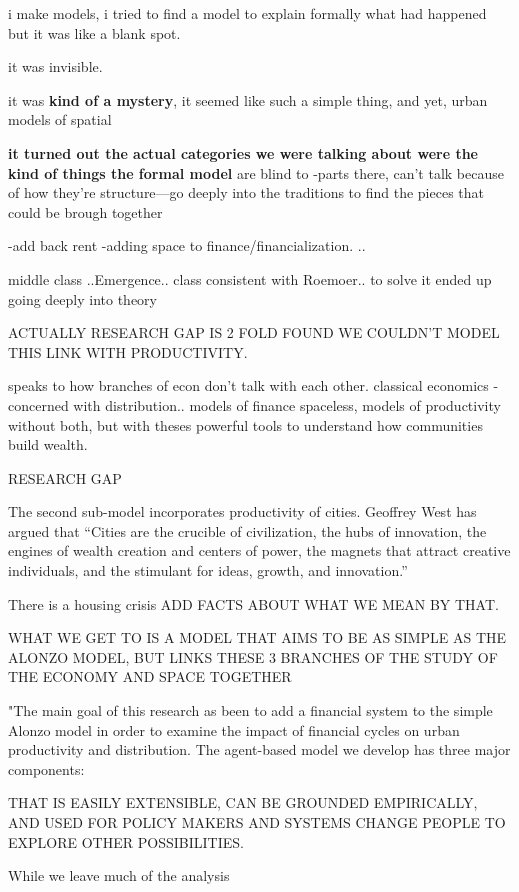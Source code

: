 i make models, i tried to find a model to explain formally what had happened
but it was like a blank spot. 

it was invisible. 

it was \textbf{kind of a mystery}, it seemed like such a simple thing, and yet, 
urban models of spatial 


\textbf{it turned out the actual categories we were talking about were the kind of things the formal model} are blind to
-parts there, can't talk because of how they're structure---go deeply into the traditions to find the pieces that could be brough together

-add back rent
-adding space to finance/financialization.
..


\gls{middle class}
..Emergence..
class consistent with Roemoer.. 
to solve it ended up going deeply into theory

ACTUALLY RESEARCH GAP IS 2 FOLD
FOUND WE COULDN'T MODEL THIS LINK WITH PRODUCTIVITY.


speaks to how branches of econ don't talk with each other. classical economics - concerned with distribution.. models of finance spaceless, models of productivity without both, but with theses powerful tools to understand how communities build wealth.


RESEARCH GAP

The second sub-model incorporates  productivity of cities. Geoffrey West has argued that ``Cities are the crucible of civilization, the hubs of innovation, the engines of wealth creation and centers of power, the magnets that attract creative individuals, and the stimulant for ideas, growth, and innovation.'' \cite{westScaleUniversalLaws2017} 


There is a housing crisis ADD FACTS ABOUT WHAT WE MEAN BY THAT.



WHAT WE GET TO IS A MODEL THAT AIMS TO BE AS SIMPLE AS THE ALONZO MODEL, BUT LINKS THESE 3 BRANCHES OF THE STUDY OF THE ECONOMY AND SPACE TOGETHER

"The main goal of this research as been to add a financial system to the simple Alonzo model in order to examine the impact of financial cycles on urban productivity and distribution. The \gls{agent-based model} we develop has three major components: 

THAT IS EASILY EXTENSIBLE, CAN BE GROUNDED EMPIRICALLY, AND USED FOR POLICY MAKERS AND SYSTEMS CHANGE PEOPLE TO EXPLORE OTHER POSSIBILITIES.


While we leave much of the analysis



